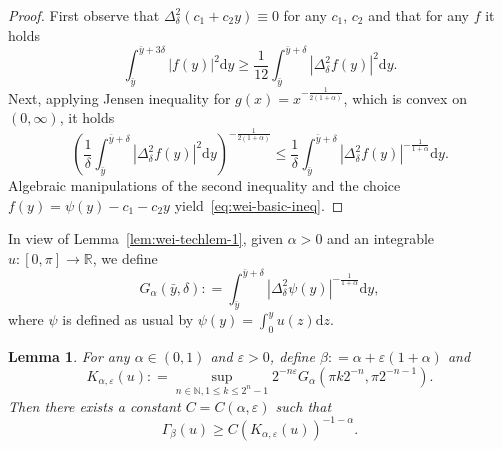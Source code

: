 \documentclass[11pt,oneside,reqno]{amsart}
\newcommand{\mathd}{\mathrm{d}}
\newtheorem{lemma}[theorem]{Lemma}
\numberwithin{equation}{section}
\begin{document}
\begin{proof}
  First observe that $\Delta^2_{\delta} (c_1 + c_2 y) \equiv 0$ for any $c_1$,
  $c_2$ and that for any $f$ it holds
  \[ \int_{\bar{y}}^{\bar{y} + 3 \delta} | f (y) |^2 \mathd y \geqslant
     \frac{1}{12} \int_{\bar{y}}^{\bar{y} + \delta} | \Delta^2_{\delta} f (y)
     |^2 \mathd y. \]
  Next, applying Jensen inequality for $g (x) = x^{- \frac{1}{2 (1 +
  \alpha)}}$, which is convex on $(0, \infty)$, it holds
  \[ \left( \frac{1}{\delta} \int_{\bar{y}}^{\bar{y} + \delta} |
     \Delta^2_{\delta} f (y) |^2 \mathd y \right)^{- \frac{1}{2 (1 + \alpha)}}
     \leqslant \frac{1}{\delta} \int_{\bar{y}}^{\bar{y} + \delta} |
     \Delta^2_{\delta} f (y) |^{- \frac{1}{1 + \alpha}} \mathd y. \]
  Algebraic manipulations of the second inequality and the choice $f (y) =
  \psi (y) - c_1 - c_2 y$ yield~\eqref{eq:wei-basic-ineq}.
\end{proof}

In view of Lemma~\ref{lem:wei-techlem-1}, given $\alpha > 0$ and an integrable
$u : [0, \pi] \rightarrow \mathbb{R}$, we define
\begin{equation}
  G_{\alpha} (\bar{y}, \delta) : = \int_{\bar{y}}^{\bar{y} +
  \delta} | \Delta^2_{\delta} \psi (y) |^{- \frac{1}{1 + \alpha}} \mathd y,
  \label{eq:def-G}
\end{equation}
where $\psi$ is defined as usual by $\psi (y) = \int_0^y u (z)
\mathd z$.

\begin{lemma}
  \label{lem:wei-techlem-2}For any $\alpha \in (0, 1)$ and $\varepsilon > 0$,
  define $\beta : = \alpha + \varepsilon (1 + \alpha)$ and
  \[ K_{\alpha, \varepsilon} (u) : = \sup_{n \in \mathbb{N}, 1 \leqslant k
     \leqslant 2^n - 1} 2^{- n \varepsilon} G_{\alpha} (\pi k 2^{- n}, \pi
     2^{- n - 1}) . \]
  Then there exists a constant $C = C (\alpha, \varepsilon)$ such that
  \[ \Gamma_{\beta} (u) \geqslant C (K_{\alpha, \varepsilon} (u))^{- 1 -
     \alpha} . \]
\end{lemma}
\end{document}
